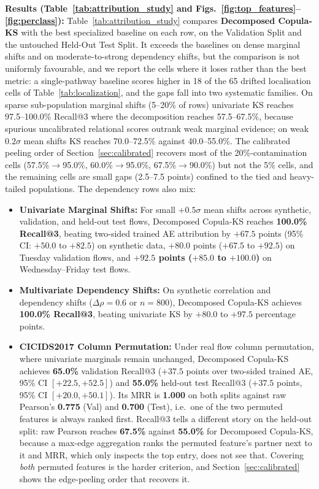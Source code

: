 \documentclass[10pt,conference]{IEEEtran}
\begin{document}
\textbf{Results (Table~\ref{tab:attribution_study} and Figs.~\ref{fig:top_features}--\ref{fig:perclass}):}
Table~\ref{tab:attribution_study} compares \textbf{Decomposed Copula-KS} with the
best specialized baseline on each row, on the Validation Split and the untouched
Held-Out Test Split. It exceeds the baselines on dense marginal shifts and on
moderate-to-strong dependency shifts, but the comparison is not uniformly
favourable, and we report the cells where it loses rather than the best metric:
a single-pathway baseline scores higher in 18 of the 65 drifted localisation
cells of Table~\ref{tab:localization}, and
the gaps fall into two systematic families. On sparse sub-population marginal
shifts (5--20\% of rows) univariate KS reaches 97.5--100.0\% Recall@3 where the
decomposition reaches 57.5--67.5\%, because spurious uncalibrated relational
scores outrank weak marginal evidence; on weak $0.2\sigma$ mean shifts KS reaches
70.0--72.5\% against 40.0--55.0\%. The calibrated peeling order of
Section~\ref{sec:calibrated} recovers most of the 20\%-contamination cells
(57.5\%$\to$95.0\%, 60.0\%$\to$95.0\%, 67.5\%$\to$90.0\%) but not the 5\% cells,
and the remaining cells are small gaps (2.5--7.5 points) confined to the
tied and heavy-tailed populations. The dependency rows also mix:
\begin{itemize}
  \item \textbf{Univariate Marginal Shifts:} For small $+0.5\sigma$ mean shifts across synthetic, validation, and held-out test flows, Decomposed Copula-KS reaches \textbf{100.0\% Recall@3}, beating two-sided trained AE attribution by $+67.5$ points (95\% CI: $+50.0$ to $+82.5$) on synthetic data, $+80.0$ points ($+67.5$ to $+92.5$) on Tuesday validation flows, and \textbf{$+92.5$ points ($+85.0$ to $+100.0$)} on Wednesday--Friday test flows.
  \item \textbf{Multivariate Dependency Shifts:} On synthetic correlation and dependency shifts ($\Delta\rho = 0.6$ or $n = 800$), Decomposed Copula-KS achieves \textbf{100.0\% Recall@3}, beating univariate KS by $+80.0$ to $+97.5$ percentage points.
  \item \textbf{CICIDS2017 Column Permutation:} Under real flow column permutation, where univariate marginals remain unchanged, Decomposed Copula-KS achieves \textbf{65.0\%} validation Recall@3 ($+37.5$ points over two-sided trained AE, 95\% CI $[+22.5, +52.5]$) and \textbf{55.0\%} held-out test Recall@3 ($+37.5$ points, 95\% CI $[+20.0, +50.1]$). Its MRR is \textbf{1.000} on both splits against raw Pearson's \textbf{0.775}
(Val) and \textbf{0.700} (Test), i.e.\ one of the two permuted features is always
ranked first. Recall@3 tells a different story on the held-out split: raw Pearson
reaches \textbf{67.5\%} against \textbf{55.0\%} for Decomposed Copula-KS, because a
max-edge aggregation ranks the permuted feature's partner next to it and MRR, which
only inspects the top entry, does not see that. Covering \emph{both} permuted
features is the harder criterion, and Section~\ref{sec:calibrated} shows the
edge-peeling order that recovers it.
\end{itemize}
\end{document}
